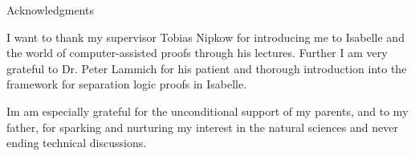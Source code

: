 \thispagestyle{empty}

\vspace*{20mm}

\begin{center}
{ Acknowledgments}
\end{center}

\vspace{10mm}
I want to thank my supervisor Tobias Nipkow for introducing me to
Isabelle and the world of computer-assisted proofs through his lectures.
Further I am very grateful to Dr. Peter Lammich for his patient
and thorough introduction into the framework for separation logic proofs in Isabelle.

Im am especially grateful for the unconditional support of my parents,
and to my father,
for sparking and nurturing my interest in the natural sciences
and never ending technical discussions.


\cleardoublepage{}
